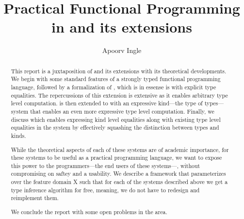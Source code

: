 \documentclass[manuscript,screen,nonacm]{acmart}
\title{Practical Functional Programming in \SFC and its extensions}
\author{Apoorv Ingle}
\affiliation{%
  \institution{University of Iowa}
  \department{Department of Computer Science}
  \streetaddress{McLean Hall}
  \city{Iowa City}
  \state{Iowa}
  \country{USA}}
\begin{document}
\begin{abstract}
  This report is a juxtaposition of \SFC and its extensions with its theoretical developments.
  We begin with some standard features of a strongly typed functional programming language, followed by a formalization of \SFC, which is in essense is \SF with explicit type equalities. The repercussions of this extension is extensive as it enables arbitrary type level computation. \SFC is then extended to \SFP with an expressive kind---the type of types---system that enables an even more expressive type level computation. Finally, we discuss \SFK which enables expressing kind level equalities along with existing type level equalities in the system by effectively squashing the distinction between types and kinds.

  While the theoretical aspects of each of these systems are of academic importance, for these systems to be useful as a practical programming language, we want to expose this power to the programmers---the end users of these systems---, without compromising on saftey and a usability. We describe a framework \HMX that parameterizes over the feature domain X such that for each of the systems described above we get a type inference algorithm for free, meaning, we do not have to redesign and reimplement them.

  We conclude the report with some open problems in the area.
\end{abstract}

\maketitle


\end{document}

